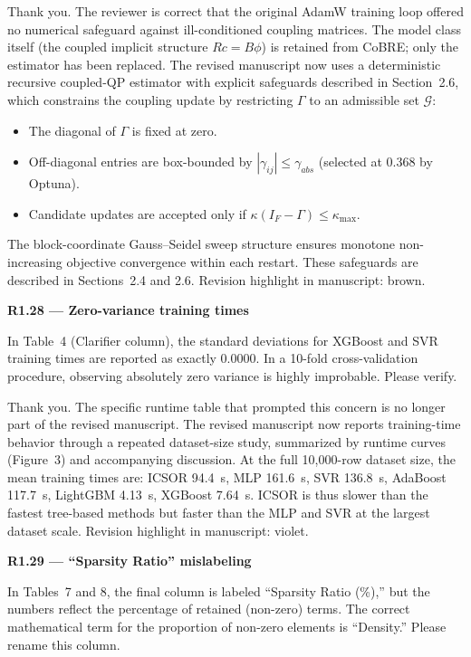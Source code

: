\documentclass[a4paper,11pt]{article}
\newcommand{\reviewlabel}[1]{\noindent\textbf{\textcolor{accentblue}{#1}}\par\medskip}
\newcommand{\revhighlight}[2]{\textcolor{#1}{Revision highlight in manuscript: #2.}}
\begin{document}
Thank you. The reviewer is correct that the original AdamW training loop offered no numerical safeguard against ill-conditioned coupling matrices. The model class itself (the coupled implicit structure $Rc = B\phi$) is retained from CoBRE; only the estimator has been replaced. The revised manuscript now uses a deterministic recursive coupled-QP estimator with explicit safeguards described in Section~2.6, which constrains the coupling update by restricting $\Gamma$ to an admissible set $\mathcal{G}$:
\begin{itemize}[nosep]
\item The diagonal of $\Gamma$ is fixed at zero.
\item Off-diagonal entries are box-bounded by $|\gamma_{ij}| \le \gamma_{abs}$ (selected at 0.368 by Optuna).
\item Candidate updates are accepted only if $\kappa(I_F - \Gamma) \le \kappa_{\max}$.
\end{itemize}
The block-coordinate Gauss--Seidel sweep structure ensures monotone non-increasing objective convergence within each restart. These safeguards are described in Sections~2.4 and 2.6. \revhighlight{revRoneTwentySeven}{brown}

\reviewlabel{R1.28 --- Zero-variance training times}
\begin{reviewbox}
In Table~4 (Clarifier column), the standard deviations for XGBoost and SVR training times are reported as exactly 0.0000. In a 10-fold cross-validation procedure, observing absolutely zero variance is highly improbable. Please verify.
\end{reviewbox}

Thank you. The specific runtime table that prompted this concern is no longer part of the revised manuscript. The revised manuscript now reports training-time behavior through a repeated dataset-size study, summarized by runtime curves (Figure~3) and accompanying discussion. At the full 10,000-row dataset size, the mean training times are: ICSOR 94.4~s, MLP 161.6~s, SVR 136.8~s, AdaBoost 117.7~s, LightGBM 4.13~s, XGBoost 7.64~s. ICSOR is thus slower than the fastest tree-based methods but faster than the MLP and SVR at the largest dataset scale. \revhighlight{revRtwoFive}{violet}

\reviewlabel{R1.29 --- ``Sparsity Ratio'' mislabeling}
\begin{reviewbox}
In Tables~7 and 8, the final column is labeled ``Sparsity Ratio (\%),'' but the numbers reflect the percentage of retained (non-zero) terms. The correct mathematical term for the proportion of non-zero elements is ``Density.'' Please rename this column.
\end{reviewbox}
\end{document}
